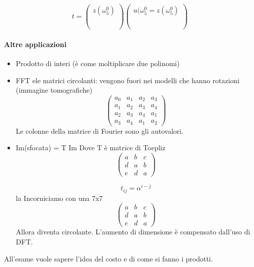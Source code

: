 $$
t = \begin{pmatrix}
  z(\omega_5^0) \\
   \\
  \\
  \\
\end{pmatrix}
\begin{pmatrix}
u(\omega_5^{0} =
  z(\omega_5^0) \\
   \\
  \\
  \\
\end{pmatrix}
$$
\paragraph{Altre applicazioni}
\begin{itemize}
\item Prodotto di interi (\`e come moltiplicare due polinomi)
\item FFT ele matrici circolanti: vengono fuori nei modelli che
     hanno rotazioni (immagine tomografiche)
$$
\begin{pmatrix}
   a_0  & a_1 &  a_2 & a_3 \\
   a_1 & a_2 & a_3 & a_4 \\
   a_2 & a_3 & a_4 & a_1 \\
   a_3 & a_4 & a_1  & a_2 
\end{pmatrix}
$$
Le colonne della matrice di Fourier sono gli autovalori.



\item Im(sfocata) = T Im
Dove T \`e matrice di Toepliz
$$
\begin{pmatrix}
  a & b & c \\
  d & a & b \\
  e & d & a
\end{pmatrix}
$$

$$ t_{ij} = \alpha^{i-j} $$
la Incorniciamo con una 7x7
$$
\begin{pmatrix}
  a & b & c \\
  d & a & b \\
  e & d & a
\end{pmatrix}
$$
Allora diventa circolante.
L'aumento di dimensione \`e compensato dall'uso di DFT.

\end{itemize}
\begin{notes}
All'esame vuole sapere l'idea del costo e di come si fanno i
prodotti.  
\end{notes}


\outbpdocument